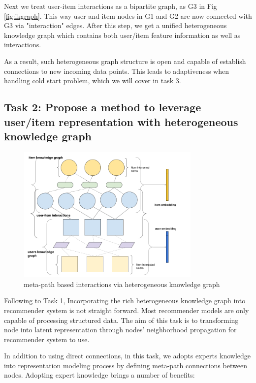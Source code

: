Next we treat user-item interactions as a bipartite graph, as G3 in Fig \ref{fig:ikgraph}. This way user and item nodes in G1 and G2 are now connected with G3 via "interaction" edges. After this step, we get a unified heterogeneous knowledge graph which contains both user/item feature information as well as interactions.

As a result, such heterogeneous graph structure is open and capable of establish connections to new incoming data points. This leads to adaptiveness when handling cold start problem, which we will cover in task 3.


\subsection*{Task 2: Propose a method to leverage user/item representation with heterogeneous knowledge graph}


\begin{figure}[!t]
    \centering
    \includegraphics[width=0.8\textwidth]{figs/meta-embedding.png}
    \caption{meta-path based interactions via heterogeneous knowledge graph}\label{fig:meta_task2}
\end{figure}

Following to Task 1, Incorporating the rich heterogeneous knowledge graph into recommender system is not straight forward. Most recommender models are only capable of processing structured data. The aim of this task is to transforming node into latent representation through nodes' neighborhood propagation for recommender system to use.

In addition to using direct connections, in this task, we adopts experts knowledge into representation modeling process by defining meta-path connections between nodes. Adopting expert knowledge brings a number of benefits:

